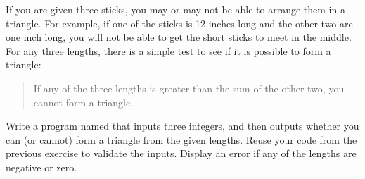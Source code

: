 \begin{exercise}  %

If you are given three sticks, you may or may not be able to arrange them in a triangle.
For example, if one of the sticks is 12 inches long and the other two are one inch long, you will not be able to get the short sticks to meet in the middle.
For any three lengths, there is a simple test to see if it is possible to form a triangle:

\begin{quotation}
\noindent
If any of the three lengths is greater than the sum of the other two, you cannot form a triangle.
\end{quotation}

Write a program named  that inputs three integers, and then outputs whether you can (or cannot) form a triangle from the given lengths.
Reuse your code from the previous exercise to validate the inputs.
Display an error if any of the lengths are negative or zero.

\end{exercise}
